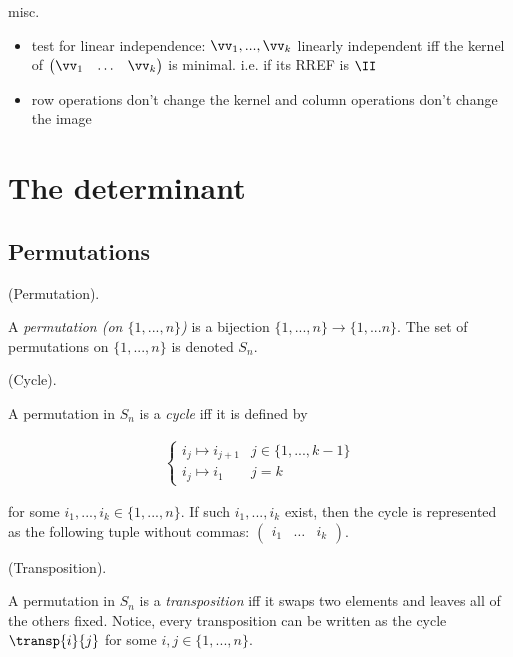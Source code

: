 misc.
\begin{itemize}
    \item test for linear independence: $\vv_1, ..., \vv_k$ linearly independent iff the kernel of $\begin{pmatrix} \vv_1 & \hdots & \vv_k \end{pmatrix}$ is minimal. i.e. if its RREF is $\II$
    \item row operations don't change the kernel and column operations don't change the image
\end{itemize}

\newpage

\section{The determinant}

\subsection*{Permutations}

\begin{defn}
    (Permutation).
    
    A \textit{permutation (on $\{1, ..., n\}$)} is a bijection $\{1, ..., n\} \rightarrow \{1, ... n \}$. The set of permutations on $\{1, ..., n\}$ is denoted $S_n$.
\end{defn}

\begin{defn}
    (Cycle).

    A permutation in $S_n$ is a \textit{cycle} iff it is defined by

    \begin{align*}
        \begin{cases}
            i_j \mapsto i_{j + 1} & j \in \{1, ..., k - 1\} \\
            i_j \mapsto i_1 & j = k
        \end{cases}
    \end{align*}

    for some $i_1, ..., i_k \in \{1, ..., n\}$. If such $i_1, ..., i_k$ exist, then the cycle is represented as the following tuple without commas: $\begin{pmatrix} i_1 & \hdots & i_k \end{pmatrix}$.
\end{defn}

\begin{defn}
    (Transposition).

    A permutation in $S_n$ is a \textit{transposition} iff it swaps two elements and leaves all of the others fixed. Notice, every transposition can be written as the cycle $\transp{i}{j}$ for some $i, j \in \{1, ..., n\}$.
\end{defn}

